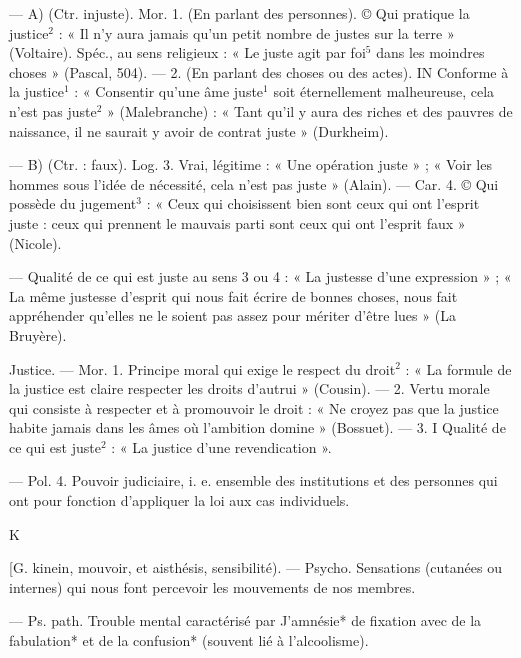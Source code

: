 \begin{itemize}[leftmargin=1cm, label=, itemsep=1pt]
 — A) (Ctr.
injuste). Mor.
1. (En parlant des personnes). © Qui
pratique la justice$^2$ : « Il n’y aura
jamais qu’un petit nombre de justes
sur la terre » (Voltaire). Spéc., au
sens religieux : « Le juste agit par
foi$^5$ dans les moindres choses »
(Pascal, 504). — 2. (En parlant des
choses ou des actes). IN Conforme à la
justice$^1$ : « Consentir qu’une âme
juste$^1$ soit éternellement malheureuse, cela n’est pas juste$^2$ » (Malebranche)
: « Tant qu'il y aura des
riches et des pauvres de naissance,
il ne saurait y avoir de contrat
juste » (Durkheim).

— B) (Ctr. : faux). Log. 3. Vrai,
légitime : « Une opération juste » ;
« Voir les hommes sous l'idée de
nécessité, cela n'est pas juste »
(Alain). — Car. 4. © Qui possède du
jugement$^3$ : « Ceux qui choisissent
bien sont ceux qui ont l'esprit juste :
ceux qui prennent le mauvais parti
sont ceux qui ont l'esprit faux »
(Nicole).

 — Qualité de ce qui est juste
au sens 3 ou 4 : « La justesse d’une
expression » ; « La même justesse
d'esprit qui nous fait écrire de
bonnes choses, nous fait appréhender
qu'elles ne le soient pas assez pour
mériter d’être lues » (La Bruyère).

\ib{}Justice. — Mor. 1. Principe moral qui
exige le respect du droit$^2$ : « La
formule de la justice est claire
respecter les droits d’autrui » (Cousin). — 2. Vertu morale qui consiste
à respecter et à promouvoir le droit :
« Ne croyez pas que la justice habite
jamais dans les âmes où l'ambition
domine » (Bossuet). — 3. I Qualité
de ce qui est juste$^2$ : « La justice
d’une revendication ».

— Pol. 4. Pouvoir judiciaire,
i. e. ensemble des institutions et des
personnes qui ont pour fonction
d'appliquer la loi aux cas individuels.

\begin{center}
K
\end{center}

 [G. kinein, mouvoir, et
aisthésis, sensibilité). — Psycho.
Sensations (cutanées ou internes)
qui nous font percevoir les mouvements de nos membres.

 — Ps. path.
Trouble mental caractérisé par
J'amnésie* de fixation avec de la
fabulation* et de la confusion*
(souvent lié à l'alcoolisme).

	\end{itemize}
